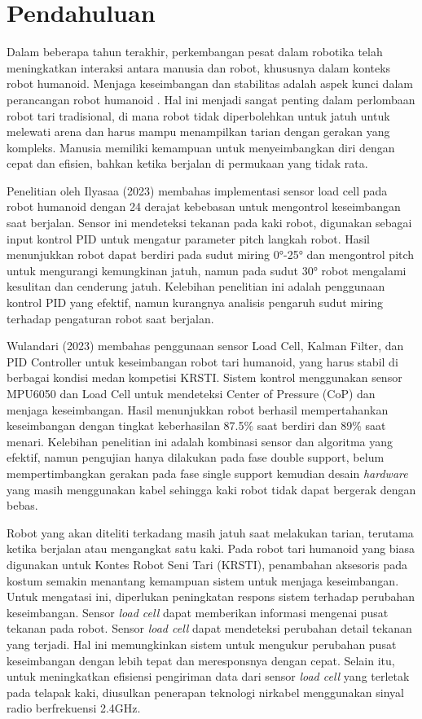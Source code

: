 \section{Pendahuluan}
\label{sec:pendahuluan}

Dalam beberapa tahun terakhir, perkembangan pesat dalam robotika telah meningkatkan interaksi antara manusia dan robot, khususnya dalam konteks robot humanoid. Menjaga keseimbangan dan stabilitas adalah aspek kunci dalam perancangan robot humanoid \cite{chiang2020posture}. Hal ini menjadi sangat penting dalam perlombaan robot tari tradisional, di mana robot tidak diperbolehkan untuk jatuh untuk melewati arena dan harus mampu menampilkan tarian dengan gerakan yang kompleks. Manusia memiliki kemampuan untuk menyeimbangkan diri dengan cepat dan efisien, bahkan ketika berjalan di permukaan yang tidak rata. 

Penelitian oleh Ilyasaa (2023)\cite{rotama} membahas implementasi sensor load cell pada robot humanoid dengan 24 derajat kebebasan untuk mengontrol keseimbangan saat berjalan. Sensor ini mendeteksi tekanan pada kaki robot, digunakan sebagai input kontrol PID untuk mengatur parameter pitch langkah robot. Hasil menunjukkan robot dapat berdiri pada sudut miring 0°-25° dan mengontrol pitch untuk mengurangi kemungkinan jatuh, namun pada sudut 30° robot mengalami kesulitan dan cenderung jatuh. Kelebihan penelitian ini adalah penggunaan kontrol PID yang efektif, namun kurangnya analisis pengaruh sudut miring terhadap pengaturan robot saat berjalan.

Wulandari (2023)\cite{lanangjagad} membahas penggunaan sensor Load Cell, Kalman Filter, dan PID Controller untuk keseimbangan robot tari humanoid, yang harus stabil di berbagai kondisi medan kompetisi KRSTI. Sistem kontrol menggunakan sensor MPU6050 dan Load Cell untuk mendeteksi Center of Pressure (CoP) dan menjaga keseimbangan. Hasil menunjukkan robot berhasil mempertahankan keseimbangan dengan tingkat keberhasilan 87.5\% saat berdiri dan 89\% saat menari. Kelebihan penelitian ini adalah kombinasi sensor dan algoritma yang efektif, namun pengujian hanya dilakukan pada fase double support, belum mempertimbangkan gerakan pada fase single support kemudian desain \emph{hardware} yang masih menggunakan kabel sehingga kaki robot tidak dapat bergerak dengan bebas.

Robot yang akan diteliti terkadang masih jatuh saat melakukan tarian, terutama ketika berjalan atau mengangkat satu kaki. Pada robot tari humanoid yang biasa digunakan untuk Kontes Robot Seni Tari (KRSTI), penambahan aksesoris pada kostum semakin menantang kemampuan sistem untuk menjaga keseimbangan. Untuk mengatasi ini, diperlukan peningkatan respons sistem terhadap perubahan keseimbangan. Sensor \emph{load cell} dapat memberikan informasi mengenai pusat tekanan pada robot. Sensor \emph{load cell} dapat mendeteksi perubahan detail tekanan yang terjadi. Hal ini memungkinkan sistem untuk mengukur perubahan pusat keseimbangan dengan lebih tepat dan meresponsnya dengan cepat. Selain itu, untuk meningkatkan efisiensi pengiriman data dari sensor \emph{load cell} yang terletak pada telapak kaki, diusulkan penerapan teknologi nirkabel menggunakan sinyal radio berfrekuensi 2.4GHz.


